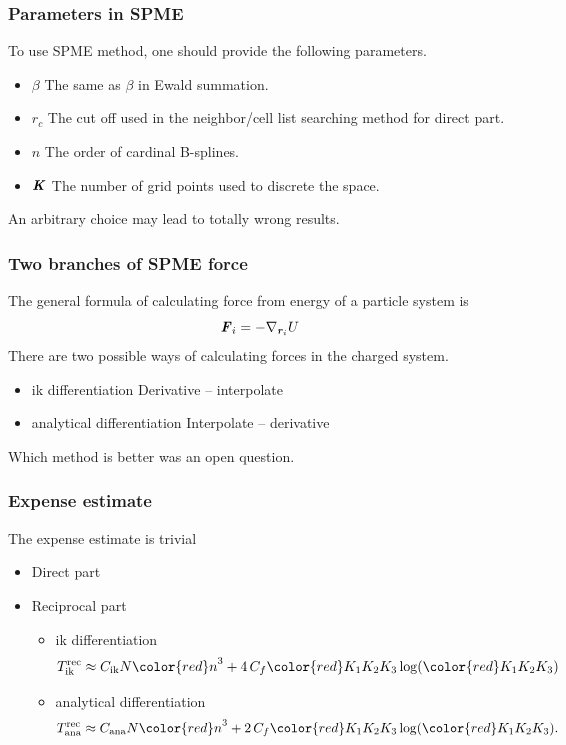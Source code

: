 \documentclass{beamer}
\newcommand{\redc}[1]{{\color{red} #1}}
\newcommand{\bluec}[1]{{\color{blue} #1}}
\renewcommand{\v}[1]{\textbf{\textit{#1}}}
\begin{document}
\begin{frame}
  \frametitle{Parameters in SPME}
  \vfill
  To use SPME method, one should provide the following parameters.
  \vfill
  \begin{itemize}
    \item \redc{$\beta$} \quad The same as $\beta$ in Ewald summation.
    \item \redc{$r_c$} \quad The cut off used in the neighbor/cell list searching method for direct part.
    \item \redc{$n$} \quad The order of cardinal B-splines.
    \item \redc{$\v K$} \quad The number of grid points used to discrete the space.
  \end{itemize}
  \vfill An arbitrary choice may lead to \redc{totally wrong
    results}. \vfill
\end{frame}


\begin{frame}
  \frametitle{Two branches of SPME force} 
  \vfill
  The general formula of calculating force from energy of a particle system is 
  \bluec{$$ \v F_i = - \nabla_{\v r_i} U $$}
  There are two possible ways of calculating forces in the charged system.
  \vfill
  \begin{itemize}
  \item \redc{ik differentiation} \newline Derivative -- interpolate
  \item \redc{analytical differentiation} \newline Interpolate -- derivative
  \end{itemize}
  \vfill
  Which method is better was an \redc{open question}.
  \vfill
\end{frame}


\begin{frame}[label=expense-esti]
  \frametitle{Expense estimate}
  The expense estimate is trivial
  \vfill
  \begin{itemize}
  \item Direct part \quad \bluec{$T^{\textrm{dir}} \approx C_d\redc{r_c}^3$} \vfill
  \item Reciprocal part \vfill
    \begin{itemize}
    \item ik differentiation \newline
      \bluec{$$
      T^{\textrm{rec}}_{\textrm{ik}}
      \approx C_{\textrm{ik}} N\redc{n}^3 + 4\, C_f  \redc{K_1K_2K_3} \log (\redc{K_1K_2K_3}) 
      $$}
    \item analytical differentiation\newline
      \bluec{$$
      T^{\textrm{rec}}_{\textrm{ana}}
      \approx C_{\textrm{ana}} N\redc{n}^3 + 2\, C_f  \redc{K_1K_2K_3} \log (\redc{K_1K_2K_3}).
      $$}
    \end{itemize}
  \end{itemize}
  \vfill \hfill
  \hyperlink{figure-fix-mesh}{}
\end{frame}
\end{document}
